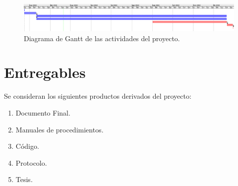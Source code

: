     \begin{figure}[H]
        \centering
        \includegraphics[width=\textwidth]{Propuesta_Plantilla_Tesis_LaTeX_UAG/imagenes/gantt.png}
        \caption{Diagrama de Gantt de las actividades del proyecto.}
        \label{fig:gantt}
    \end{figure}


\section{Entregables}

    Se consideran los siguientes productos derivados del proyecto:
    
    \begin{enumerate}
        \item Documento Final.
        \item Manuales de procedimientos.
        \item Código.
        \item Protocolo.
        \item Tesis.
    \end{enumerate}
